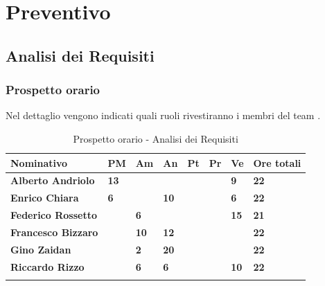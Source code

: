 \section{Preventivo}

\subsection{Analisi dei Requisiti}
\subsubsection{Prospetto orario}
Nel dettaglio vengono indicati quali ruoli rivestiranno i membri del team \GRUPPO.
\begin{center}
	\def\arraystretch{1.6}
	\bgroup
	\begin{longtable}{| p{4cm} | p{1cm} | p{1cm} | p{1cm} | p{1cm}| p{1cm} | 
	p{1cm} | p{1.7cm}|}
		\hline
		\textbf{Nominativo} & \textbf{PM} & \textbf{Am} & \textbf{An} & 
		\textbf{Pt} & \textbf{Pr} & \textbf{Ve} & \textbf{Ore totali}\\ 
		
		\hline \hline  
		
		\textbf{Alberto Andriolo} & \textbf{13} & \textbf{} & \textbf{} & 
		\textbf{} & \textbf{} & \textbf{9} & \textbf{22}\\ 
		\hline 
		
		\textbf{Enrico Chiara} & \textbf{6} & \textbf{} & \textbf{10} & 
		\textbf{} & \textbf{} & \textbf{6} & \textbf{22}\\ 
		\hline 
		
		\textbf{Federico Rossetto} & \textbf{} & \textbf{6} & \textbf{} & 
		\textbf{} & \textbf{} & \textbf{15} & \textbf{21}\\ 
		\hline 
		
		\textbf{Francesco Bizzaro} & \textbf{} & \textbf{10} & \textbf{12} & 
		\textbf{} & \textbf{} & \textbf{} & \textbf{22}\\ 
		\hline 
		
		\textbf{Gino Zaidan} & \textbf{} & \textbf{2} & \textbf{20} & 
		\textbf{} & \textbf{} & \textbf{} & \textbf{22}\\ 
		\hline 
		
		\textbf{Riccardo Rizzo} & \textbf{} & \textbf{6} & \textbf{6} & 
		\textbf{} & \textbf{} & \textbf{10} & \textbf{22}\\ 
		\hline 
			
		\hline 
			
		\caption{Prospetto orario - Analisi dei Requisiti}
	\end{longtable}
	\egroup
\end{center}

